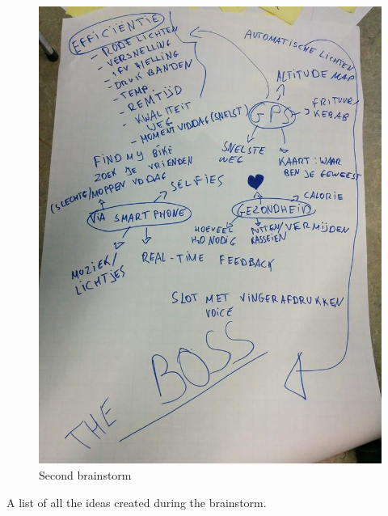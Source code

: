 \begin{figure}[H]
\center
 \includegraphics[width=\linewidth]{brainstorm/brainstorm2.jpg}
 \caption{Second brainstorm}
 \label{image:ganttchart}
\end{figure}
A list of all the ideas created during the brainstorm.
